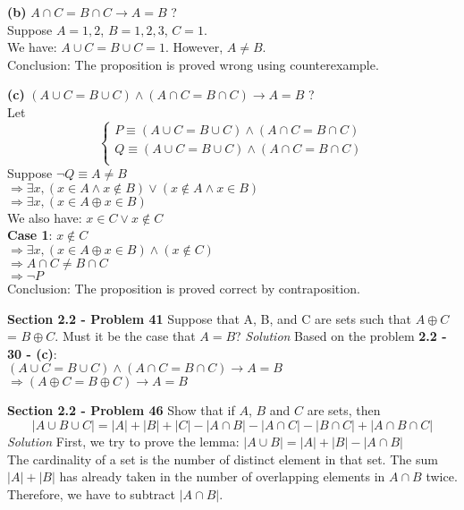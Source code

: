 \documentclass[10pt]{article}
\newcounter{problem}
\renewcommand{\implies}{\rightarrow}
\renewcommand{\lor}{\vee}
\renewcommand{\land}{\wedge}
\newcommand{\xor}{\oplus}
\begin{document}
    \par \textbf{(b)} $A \cap C = B \cap C \implies A = B$ ? \\
        Suppose $A = {1, 2}$, $B = {1, 2, 3}$, $C = {1}$. \\
        We have: $A \cup C = B \cup C = {1}$. However, $A \neq B$. \\
        Conclusion: The proposition is proved wrong using counterexample.

    \par \textbf{(c)} $(A \cup C = B \cup C) \land (A \cap C = B \cap C) \implies A = B$ ? \\
        Let
        \begin{equation}
            \begin{cases}
            P \equiv (A \cup C = B \cup C) \land (A \cap C = B \cap C) \\ 
            Q \equiv (A \cup C = B \cup C) \land (A \cap C = B \cap C) \\ 
            \end{cases}
        \end{equation}
        Suppose $\lnot Q \equiv A \neq B$ \\
        $\Rightarrow \exists x, (x \in A \land x \not \in B) \lor (x \not \in A \land x \in B)$ \\
        $\Rightarrow \exists x, (x \in A \xor x \in B)$ \\
        We also have: $x \in C \lor x \not \in C$ \\
        \textbf{Case 1}: $x \not \in C$ \\
        $\Rightarrow \exists x, (x \in A \xor x \in B) \land (x \not \in C)$ \\
        $\Rightarrow A \cap C \neq B \cap C$ \\
        $\Rightarrow \lnot P$ \\
        Conclusion: The proposition is proved correct by contraposition.

\clearpage
\textbf{Section 2.2 - Problem 41}
Suppose that A, B, and C are sets such that $A \xor C$ = $B \xor C$. Must it
be the case that $A = B$?
\bigbreak
\textit{Solution} 
\bigbreak
    Based on the problem \textbf{2.2 - 30 - (c)}: \\
    $(A \cup C = B \cup C) \land (A \cap C = B \cap C) \implies A = B$ \\
    $\Rightarrow (A \xor C = B \xor C) \implies A = B$

\clearpage
\textbf{Section 2.2 - Problem 46}
Show that if $A$, $B$ and $C$ are sets, then
\begin{equation}
    |A \cup B \cup C| = |A| + |B| + |C| - |A \cap B| - |A \cap C| - |B \cap C|
    + |A \cap B \cap C|
\end{equation}
\bigbreak
\textit{Solution} 
\bigbreak
    First, we try to prove the lemma: $|A \cup B| = |A| + |B| - |A \cap B|$ \\
    The cardinality of a set is the number of distinct element in that set.
    The sum $|A| + |B|$ has already taken in the number of overlapping elements in
    $A \cap B$ twice. Therefore, we have to subtract $|A \cap B|$.
    \break
\end{document}
